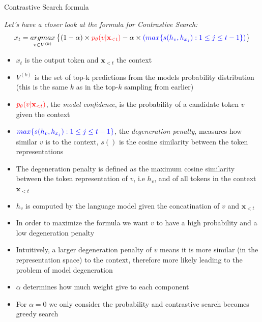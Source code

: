 
\begin{vbframe}{Contrastive Search formula}


\hspace{}

\textit{Let's have a closer look at the formula for Contrastive Search:}
\small
$$x_t = \underset{v \in V^{(k)}}{argmax}\left\{(1 - \alpha) \times \textcolor{red}{p_\theta(v|\mathbf{x}_{<t})} - \alpha \times \textcolor{blue}{(max\{s(h_v,h_{x_j}):1\leq j \leq t-1\})}\right\}$$

\begin{itemize}
    \item $x_t$ is the output token and $\mathbf{x}_{<t}$ the context
    \item $V^{(k)}$ is the set of top-k predictions from the models probability distribution (this is the same $k$ as in the top-$k$ sampling from earlier)
    \item $\textcolor{red}{p_\theta(v|\mathbf{x}_{<t})}$, the \textit{model confidence}, is the probability of a candidate token $v$ given the context
    \item $\textcolor{blue}{max\{s(h_v,h_{x_j}):1\leq j \leq t-1\}}$, the \textit{degeneration penalty}, measures how similar $v$ is to the context, $s()$ is the cosine similarity between the token representations
    \item The degeneration penalty is defined as the maximum cosine similarity between the token representation of $v$, i.e $h_v$, and of all tokens in the context $\mathbf{x}_{<t}$
    \item $h_v$ is computed by the language model given the concatination of $v$ and $\mathbf{x}_{<t}$
    \item In order to maximize the formula we want $v$ to have a high probability and a low degeneration penalty
    \item Intuitively, a larger degeneration penalty of $v$ means it is more similar (in the representation space) to the context, therefore more likely leading to the problem of model degeneration
    \item $\alpha$ determines how much weight give to each component
    \item For $\alpha = 0$ we only consider the probability and contrastive search becomes greedy search
\end{itemize}

\vfill

\end{vbframe}


